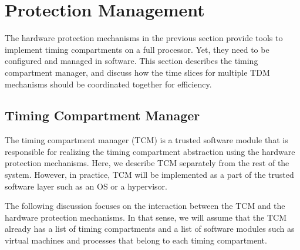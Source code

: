 \section{Protection Management}

The hardware protection mechanisms in the previous section provide tools
to implement timing compartments on a full processor. Yet, they need to be
configured and managed in software. 
This section describes the timing compartment manager, 
and discuss how the time slices for multiple TDM mechanisms should be
coordinated together for efficiency.

\subsection{Timing Compartment Manager}
\label{sec:integration_tcm}

The timing compartment manager (TCM) is a trusted software module that is
responsible for realizing the timing compartment abstraction using the
hardware protection mechanisms.
Here, we describe TCM separately from the rest of the system.
However, in practice, TCM will be implemented as a part of the trusted software
layer such as an OS or a hypervisor.

The following discussion focuses on the interaction between the TCM and the 
hardware
protection mechanisms. In that sense, we will assume that the TCM already has
a list of timing compartments and a list of software modules such as virtual
machines and processes that belong to each timing compartment. 


